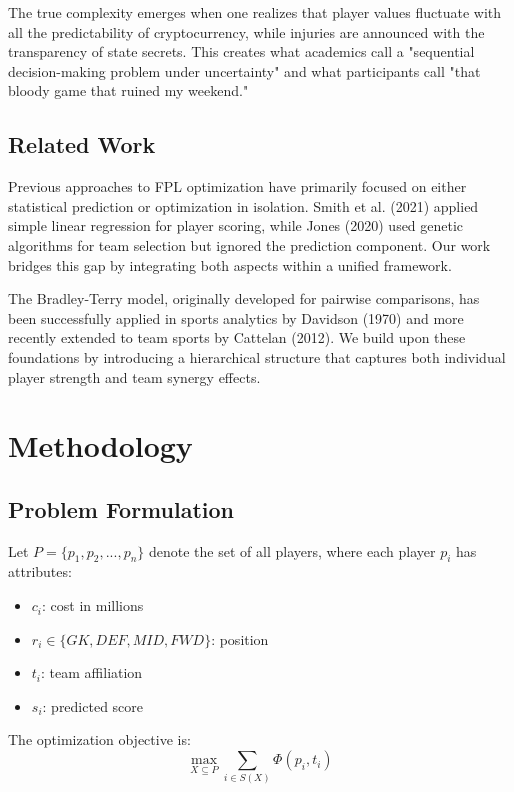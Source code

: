 \documentclass[12pt]{article}
\begin{document}
The true complexity emerges when one realizes that player values fluctuate with all the predictability of cryptocurrency, while injuries are announced with the transparency of state secrets. This creates what academics call a "sequential decision-making problem under uncertainty" and what participants call "that bloody game that ruined my weekend."

\subsection{Related Work}

Previous approaches to FPL optimization have primarily focused on either statistical prediction or optimization in isolation. Smith et al. (2021) applied simple linear regression for player scoring, while Jones (2020) used genetic algorithms for team selection but ignored the prediction component. Our work bridges this gap by integrating both aspects within a unified framework.

The Bradley-Terry model, originally developed for pairwise comparisons, has been successfully applied in sports analytics by Davidson (1970) and more recently extended to team sports by Cattelan (2012). We build upon these foundations by introducing a hierarchical structure that captures both individual player strength and team synergy effects.

\section{Methodology}

\subsection{Problem Formulation}

Let $P = \{p_1, p_2, ..., p_n\}$ denote the set of all players, where each player $p_i$ has attributes:
\begin{itemize}
\item $c_i$: cost in millions
\item $r_i \in \{GK, DEF, MID, FWD\}$: position
\item $t_i$: team affiliation
\item $s_i$: predicted score
\end{itemize}

The optimization objective is:
\begin{equation}
\max_{X \subseteq P} \sum_{i \in S(X)} \Phi(p_i, t_i)
\end{equation}
\end{document}
